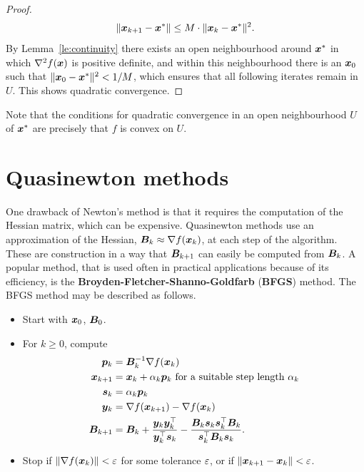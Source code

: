 \begin{proof}
\begin{equation*}
 \Vert {\bm{x}_{k+1}-\bm{x}^*}\Vert \leq M\cdot \Vert {\bm{x}_k-\bm{x}^*}\Vert^2.
\end{equation*}
By Lemma~\ref{le:continuity} there exists an open neighbourhood around $\bm{x}^*$ in which $\nabla^2f(\bm{x})$ is positive definite, and within this neighbourhood there is an $\bm{x}_0$ such that $\Vert {\bm{x}_0-\bm{x}^*}\Vert^2<1/M$, which ensures that all following iterates remain in $U$. This shows quadratic convergence. 
\end{proof}

Note that the conditions for quadratic convergence in an open neighbourhood $U$ of $\bm{x}^*$ are precisely that $f$ is convex on $U$.

\section{Quasinewton methods}
One drawback of Newton's method is that it requires the computation of the Hessian matrix, which can be expensive.
Quasinewton methods use an approximation of the Hessian, $\bm{B}_k\approx \nabla f(\bm{x}_k)$, at each step of the algorithm. These are construction in a way that $\bm{B}_{k+1}$ can easily be computed from $\bm{B}_k$. A popular method, that is used often in practical applications because of its efficiency, is the \textbf{Broyden-Fletcher-Shanno-Goldfarb} (\textbf{BFGS}) method. The BFGS method may be described as follows.

\begin{itemize}
\item Start with $\bm{x}_0$, $\bm{B}_0$.
\item For $k\geq 0$, compute
\begin{align*}
  \bm{p}_k &= \bm{B}^{-1}_k \nabla f(\bm{x}_k)\\
  \bm{x}_{k+1} &= \bm{x}_k + \alpha_k \bm{p}_k \text{ for a suitable step length } \alpha_k\\
  \bm{s}_k &= \alpha_k \bm{p}_k\\
  \bm{y}_k &= \nabla f(\bm{x}_{k+1})-\nabla f(\bm{x}_k)\\
  \bm{B}_{k+1} &= \bm{B}_k+\frac{\bm{y}_k\bm{y}_k^{\top}}{\bm{y}_k^{\top}\bm{s}_k}-\frac{\bm{B}_k\bm{s}_k\bm{s}_k^{\top}\bm{B}_k}{\bm{s}_k^{\top}\bm{B}_k\bm{s}_k}. 
\end{align*}
\item Stop if $\Vert {\nabla f(\bm{x}_k)}\Vert<\varepsilon$ for some tolerance $\varepsilon$, or if $\Vert {\bm{x}_{k+1}-\bm{x}_k}\Vert<\varepsilon$. 
\end{itemize}


